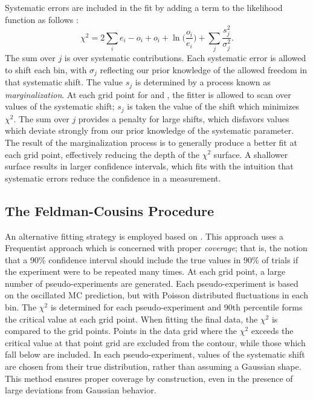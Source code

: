 Systematic errors are included in the fit by adding a term to the likelihood
function as follows \cite{pdg}:
\begin{equation}
\chi^2 = 2 \sum_i e_i - o_i + o_i + \ln \bigg (\frac{o_i}{e_i} \bigg)
+ \sum_j \frac{s_j^2}{\sigma_j^2}.
\end{equation}
The sum over $j$ is over systematic contributions.  Each systematic error
is allowed to shift each bin, with $\sigma_j$ reflecting our prior
knowledge of the allowed freedom in that systematic shift.
The value $s_j$ is determined by a process known as \textit{marginalization}.
At each grid point for \deltamtht and \thetatth, the fitter is allowed to scan
over values of the systematic shift; $s_j$ is taken the value of the shift
which minimizes $\chi^2$.
The sum over $j$ provides a penalty for large shifts, which disfavors values
which deviate strongly from our prior knowledge of the systematic parameter.
The result of the marginalization process is to generally produce a better fit
at each grid point, effectively reducing the depth of the $\chi^2$ surface.
A shallower surface results in larger confidence intervals, which fits with
the intuition that systematic errors reduce the confidence in a measurement.

\subsection{The Feldman-Cousins Procedure}
\label{feldman_cousins_section}

An alternative fitting strategy is employed based on \cite{feldman1998unified}.
This approach uses a Frequentist approach which is concerned with proper
\textit{coverage}; that is, the notion that a 90\% confidence interval
should include the true values in 90\% of trials if the experiment
were to be repeated many times.
At each grid point, a large number of pseudo-experiments are generated.
Each pseudo-experiment is based on the oscillated MC prediction, but with
Poisson distributed fluctuations in each bin.
The $\chi^2$ is determined for each pseudo-experiment
and 90th percentile forms the critical value at each grid point.
When fitting the final data, the $\chi^2$ is compared to the grid points.
Points in the data grid where the $\chi^2$ exceeds the critical value at that
point grid are excluded from the contour, while those which fall below are
included.
In each pseudo-experiment, values of the systematic shift are chosen from their
true distribution, rather than assuming a Gaussian shape.
This method ensures proper coverage by construction, even in the presence
of large deviations from Gaussian behavior.





